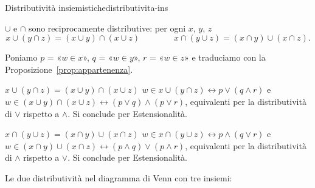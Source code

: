 \begin{concetto}
\begin{Proposizione}{Distributività insiemistiche}{distributivita-ins}
    \begin{prerequisiti}
    \end{prerequisiti}
    $\cup$ e $\cap$ sono reciprocamente distributive: per ogni $x$, $y$, $z$
    \[ x \cup (y \cap z) = (x \cup y) \cap (x \cup z) \qquad\qquad x \cap (y \cup z) = (x \cap y) \cup (x \cap z). \]
\end{Proposizione}
\begin{dimostrazione}
    Poniamo $p$ = «$w \in x$», $q$ = «$w \in y$», $r$ = «$w \in z$» e traduciamo con la Proposizione~\ref{prop:appartenenza}.
    \begin{caso}{$x \cup (y \cap z) = (x \cup y) \cap (x \cup z)$}
        $w \in x \cup (y \cap z) \leftrightarrow p \vee (q \wedge r)$ e $w \in (x \cup y) \cap (x \cup z) \leftrightarrow (p \vee q) \wedge (p \vee r)$,
        equivalenti per la distributività di $\vee$ rispetto a $\wedge$. Si conclude per Estensionalità.
    \end{caso}
    \begin{caso}{$x \cap (y \cup z) = (x \cap y) \cup (x \cap z)$}
        $w \in x \cap (y \cup z) \leftrightarrow p \wedge (q \vee r)$ e $w \in (x \cap y) \cup (x \cap z) \leftrightarrow (p \wedge q) \vee (p \wedge r)$,
        equivalenti per la distributività di $\wedge$ rispetto a $\vee$. Si conclude per Estensionalità.
    \end{caso}
\end{dimostrazione}
\end{concetto}

\begin{spiegazione}
    Le due distributività nel diagramma di Venn con tre insiemi:
    \begin{center}
    \end{center}
\end{spiegazione}


